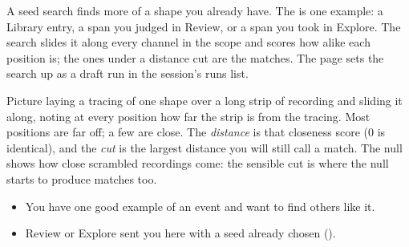 A seed search finds more of a shape you already have. The  is one example: a
Library entry, a span you judged in Review, or a span you took in Explore. The search slides it
along every channel in the scope and scores how alike each position is; the ones under a distance
cut are the matches. The page sets the search up as a draft run in the session's runs list.

\begin{plainterms}
Picture laying a tracing of one shape over a long strip of recording and sliding it along, noting
at every position how far the strip is from the tracing. Most positions are far off; a few are
close. The \emph{distance} is that closeness score (0 is identical), and the \emph{cut} is the
largest distance you will still call a match. The null shows how close scrambled recordings come:
the sensible cut is where the null starts to produce matches too.
\end{plainterms}

\begin{itemize}
  \item You have one good example of an event and want to find others like it.
  \item Review or Explore sent you here with a seed already chosen ().
\end{itemize}



